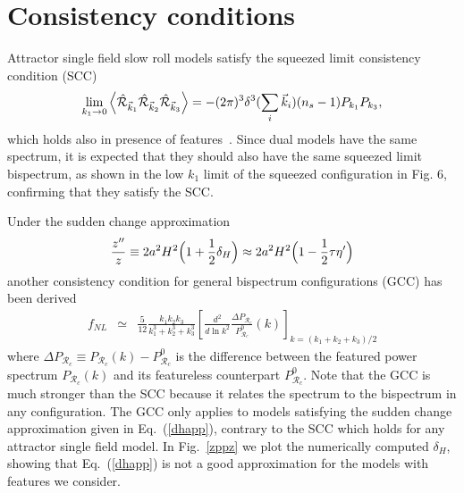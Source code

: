 \documentclass[aps,prl,amsmath,nofootinbib,twocolumn]{revtex4}
\newcommand{\3}{\partial}
\newcommand{\4}{\frac}
\newcommand{\5}{\delta}
\renewcommand\({\left(}
\renewcommand\){\right)}
\renewcommand\[{\left[}
\renewcommand\]{\right]}
\newcommand{\be}{\begin{equation}}
\newcommand{\ee}{\end{equation}}
\newcommand{\bea}{\begin{eqnarray}}
\newcommand{\eea}{\end{eqnarray}}
\begin{document}
\section{Consistency conditions}

Attractor single field slow roll models satisfy the squeezed limit consistency condition (SCC)~\cite{m,Creminelli:2004yq,Romano:2016gop}
\bea
\label{mcc}
\lim_{k_1 \to 0} \Braket{ \hat{\mathcal{R}}_{\vec{k}_1} \hat{\mathcal{R}}_{\vec{k}_2} \hat{\mathcal{R}}_{\vec{k}_3} } =  
- (2 \pi)^3 \delta^3(\sum_i \vec k_i)(n_s-1) P_{k_1} P_{k_3},\nonumber
\eea
which holds also in presence of features~\cite{Adshead:2013zfa, Passaglia:2018afq}. 
Since  dual models have the same spectrum, it is expected that they should also have the same squeezed limit bispectrum, as shown in the low $k_1$ limit of the squeezed configuration in Fig. 6, confirming that they satisfy the SCC.

Under  the sudden change approximation~\cite{Palma:2014hra} 
\be
\frac{z''}{z} \equiv  2a^2H^2 \Bigl(1 +\frac{1}{2} \delta_H \Bigr) \approx 2a^2H^2 \Bigl(1-\frac{1}{2}\tau \eta' \Bigr)
\label{dhapp} 
\ee
another consistency condition for general bispectrum configurations (GCC)  has been derived  
\bea
f_{NL}  &\simeq&   \frac{5}{12} \frac{k_1 k_2 k_3}{k_1^3 + k_2^3 + k_3^3}  \left[ \frac{d^2}{d \ln k^2}  \frac{\Delta P_{\mathcal{R}_{c}}}{P_{\mathcal{R}_{c}}^0} (k)  \right]_{k = (k_1 + k_2 + k_3)/2}  \label{quasi-equi}  
\eea
where  $\Delta P_{\mathcal{R}_{c}} \equiv P_{\mathcal{R}_{c}}(k) - P_{\mathcal{R}_{c}}^0 $ is the difference between the featured power spectrum $P_{\mathcal{R}_{c}}(k)$ and its featureless counterpart $P_{\mathcal{R}_{c}}^0$. Note that the GCC is much stronger than the SCC because it relates the spectrum to the bispectrum in any configuration. The GCC only applies to models satisfying the sudden change approximation given in Eq.~(\ref{dhapp}), contrary to the SCC which holds for any attractor single field model.
In Fig.~\ref{zppz} we plot the numerically computed $\delta_H$, showing that Eq.~(\ref{dhapp}) is not  a good approximation for the models with features we consider. %
\end{document}
